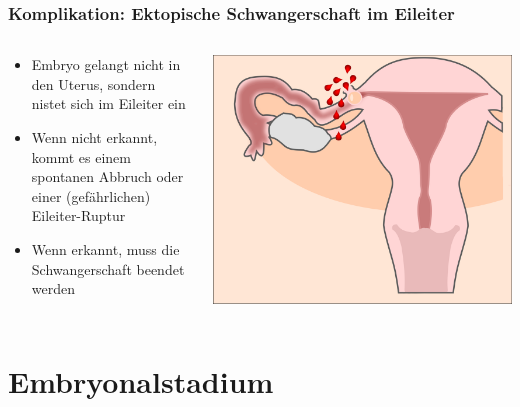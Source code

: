 \documentclass{beamer}
\begin{document}
\begin{frame}
\frametitle{Komplikation: Ektopische Schwangerschaft im Eileiter}


\begin{columns}[c]
\begin{column}{5cm}

\begin{itemize}

\item
Embryo gelangt nicht in den Uterus, sondern nistet sich im Eileiter ein
\item
Wenn nicht erkannt,  kommt es  einem spontanen Abbruch oder einer (gefährlichen) Eileiter-Ruptur
\item
Wenn erkannt, muss die Schwangerschaft beendet werden
\end{itemize}

\end{column}

\begin{column}{5cm}

\begin{center}
\includegraphics[width=\textwidth]{Eileiterruptur.png}
\end{center}


\end{column}
\end{columns}


\end{frame}

\section{Embryonalstadium}
\end{document}
